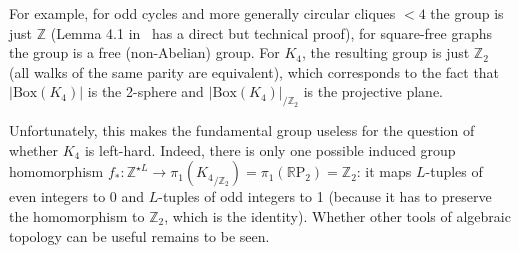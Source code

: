 \documentclass[11pt,a4paper]{scrartcl}
\numberwithin{theorem}{section}
\theoremstyle{definition}
\newcommand{\ZZ}{\mathbb{Z}}
\newcommand{\RR}{\mathbb{R}}
\newcommand\BBox[1]{\left|\mathrm{Box}(#1)\right|}
\begin{document}
For example, for odd cycles and more generally circular cliques $<4$ the group is just $\ZZ$ (Lemma 4.1 in~\cite{Wrochna17} has a direct but technical proof), for square-free graphs the group is a free (non-Abelian) group.
For $K_4$, the resulting group is just $\ZZ_2$ (all walks of the same parity are equivalent), which corresponds to the fact that $\BBox{K_4}$ is the 2-sphere and $\BBox{K_4}_{/\ZZ_2}$ is the projective plane.

Unfortunately, this makes the fundamental group useless for the question of whether $K_4$ is left-hard.
Indeed, there is only one possible induced group homomorphism $f_* \colon \ZZ^{\star L} \to \pi_1({K_4}_{/\ZZ_2}) = \pi_1(\RR\mathrm{P}_2) = \ZZ_2$: it maps $L$-tuples of even integers to 0 and  $L$-tuples of odd integers to 1 (because it has to preserve the homomorphism to $\ZZ_2$, which is the identity).
Whether other tools of algebraic topology can be useful remains to be seen.


%
%
\printbibliography

	
\end{document}
